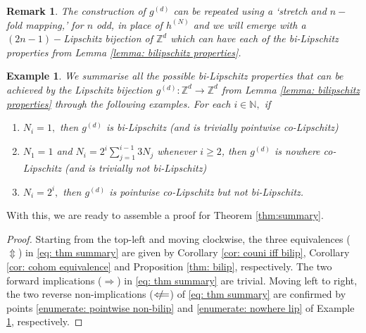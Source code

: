 \documentclass{article}
\newtheorem{remark}[define]{Remark}
\newtheorem{example}[define]{Example}
\newcommand{\Z}{\mathbb{Z}}
\newcommand{\N}{\mathbb{N}}
\begin{document}
\begin{remark}
    The construction of $g^{(d)}$ can be repeated using a `stretch and $n-$fold mapping,' for $n$ odd, in place of $h^{(N)}$ and we will emerge with a $(2n-1)-$Lipschitz bijection of $\Z^d$ which can have each of the bi-Lipschitz properties from Lemma \ref{lemma: bilipschitz properties}.
\end{remark}

\begin{example} \label{example: main}
We summarise all the possible bi-Lipschitz properties that can be achieved by the Lipschitz bijection $g^{(d)}:\Z^d \to \Z^d$ from Lemma \ref{lemma: bilipschitz properties} through the following examples. For each $i \in \N,$ if
\begin{enumerate}
  \item $N_i = 1,$ then $g^{(d)}$ is bi-Lipschitz (and is trivially pointwise co-Lipschitz)
    \item \label{enumerate: nowhere lip} $N_1 = 1$ and $N_i = 2^{i}\sum_{j=1}^{i-1}3N_j$ whenever $i \geq 2$, then $g^{(d)}$ is nowhere co-Lipschitz (and is trivially not bi-Lipschitz)
    \item \label{enumerate: pointwise non-bilip} $N_i = 2^{i},$ then $g^{(d)}$ is pointwise co-Lipschitz but not bi-Lipschitz.
\end{enumerate}
\end{example}
With this, we are ready to assemble a proof for Theorem \ref{thm:summary}.
\summary*
\begin{proof}
    Starting from the top-left and moving clockwise, the three equivalences ($\Updownarrow$) in \eqref{eq: thm summary} are given by Corollary \ref{cor: couni iff bilip}, Corollary \ref{cor: cohom equivalence} and Proposition \ref{thm: bilip}, respectively. The two forward implications ($\Longrightarrow$) in \eqref{eq: thm summary} are trivial. Moving left to right, the two reverse non-implications ($\mathrel{\rlap{\hskip .5em/}}\Longleftarrow$) of \eqref{eq: thm summary} are confirmed by points \ref{enumerate: pointwise non-bilip} and \ref{enumerate: nowhere lip} of Example \ref{example: main}, respectively.
\end{proof}
\end{document}
